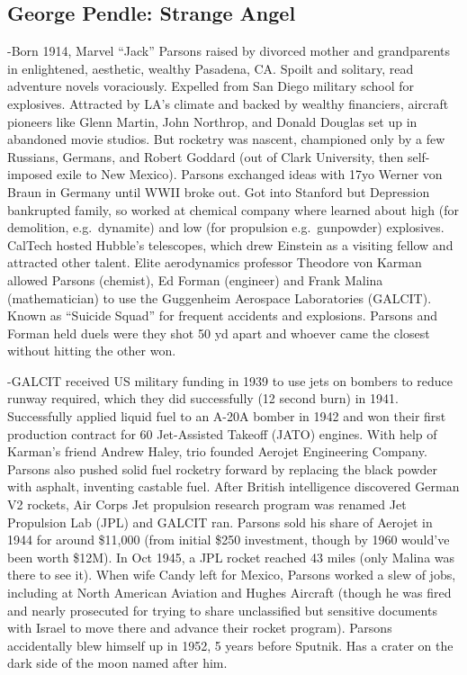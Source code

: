 \documentclass[
]{article}
\begin{document}
\hypertarget{george-pendle-strange-angel}{%
\subsection{George Pendle: Strange
Angel}\label{george-pendle-strange-angel}}

-Born 1914, Marvel ``Jack'' Parsons raised by divorced mother and
grandparents in enlightened, aesthetic, wealthy Pasadena, CA. Spoilt and
solitary, read adventure novels voraciously. Expelled from San Diego
military school for explosives. Attracted by LA's climate and backed by
wealthy financiers, aircraft pioneers like Glenn Martin, John Northrop,
and Donald Douglas set up in abandoned movie studios. But rocketry was
nascent, championed only by a few Russians, Germans, and Robert Goddard
(out of Clark University, then self-imposed exile to New Mexico).
Parsons exchanged ideas with 17yo Werner von Braun in Germany until WWII
broke out. Got into Stanford but Depression bankrupted family, so worked
at chemical company where learned about high (for demolition,
e.g.~dynamite) and low (for propulsion e.g.~gunpowder) explosives.
CalTech hosted Hubble's telescopes, which drew Einstein as a visiting
fellow and attracted other talent. Elite aerodynamics professor Theodore
von Karman allowed Parsons (chemist), Ed Forman (engineer) and Frank
Malina (mathematician) to use the Guggenheim Aerospace Laboratories
(GALCIT). Known as ``Suicide Squad'' for frequent accidents and
explosions. Parsons and Forman held duels were they shot 50 yd apart and
whoever came the closest without hitting the other won.

-GALCIT received US military funding in 1939 to use jets on bombers to
reduce runway required, which they did successfully (12 second burn) in
1941. Successfully applied liquid fuel to an A-20A bomber in 1942 and
won their first production contract for 60 Jet-Assisted Takeoff (JATO)
engines. With help of Karman's friend Andrew Haley, trio founded Aerojet
Engineering Company. Parsons also pushed solid fuel rocketry forward by
replacing the black powder with asphalt, inventing castable fuel. After
British intelligence discovered German V2 rockets, Air Corps Jet
propulsion research program was renamed Jet Propulsion Lab (JPL) and
GALCIT ran. Parsons sold his share of Aerojet in 1944 for around
\$11,000 (from initial \$250 investment, though by 1960 would've been
worth \$12M). In Oct 1945, a JPL rocket reached 43 miles (only Malina
was there to see it). When wife Candy left for Mexico, Parsons worked a
slew of jobs, including at North American Aviation and Hughes Aircraft
(though he was fired and nearly prosecuted for trying to share
unclassified but sensitive documents with Israel to move there and
advance their rocket program). Parsons accidentally blew himself up in
1952, 5 years before Sputnik. Has a crater on the dark side of the moon
named after him.
\end{document}
